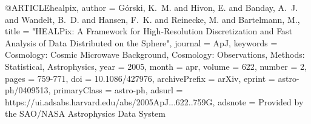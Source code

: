 
@ARTICLE{healpix,
       author = {{G{\'o}rski}, K.~M. and {Hivon}, E. and {Banday}, A.~J. and {Wandelt}, B.~D. and {Hansen}, F.~K. and {Reinecke}, M. and {Bartelmann}, M.},
        title = "{HEALPix: A Framework for High-Resolution Discretization and Fast Analysis of Data Distributed on the Sphere}",
      journal = {ApJ},
     keywords = {Cosmology: Cosmic Microwave Background, Cosmology: Observations, Methods: Statistical, Astrophysics},
         year = 2005,
        month = apr,
       volume = {622},
       number = {2},
        pages = {759-771},
          doi = {10.1086/427976},
archivePrefix = {arXiv},
       eprint = {astro-ph/0409513},
 primaryClass = {astro-ph},
       adsurl = {https://ui.adsabs.harvard.edu/abs/2005ApJ...622..759G},
      adsnote = {Provided by the SAO/NASA Astrophysics Data System}
}
